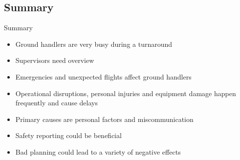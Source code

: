 \subsection{Summary}
\begin{frame}{Summary}{}
	\begin{itemize}
		\item Ground handlers are very busy during a turnaround
		\item Supervisors need overview
		\item Emergencies and unexpected flights affect ground handlers
		\item Operational disruptions, personal injuries and equipment damage happen frequently and cause delays
		\item Primary causes are personal factors and miscommunication
		\item Safety reporting could be beneficial
		\item Bad planning could lead to a variety of negative effects
	\end{itemize}
\end{frame}